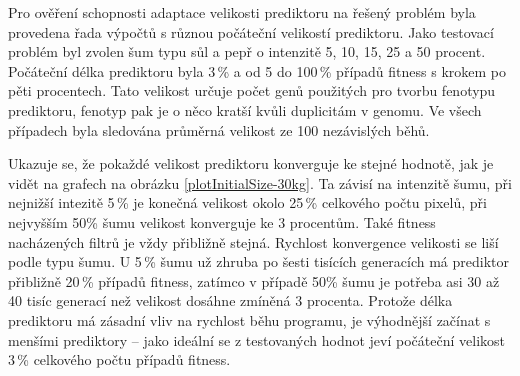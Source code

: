 Pro ověření schopnosti adaptace velikosti prediktoru na řešený problém byla provedena řada výpočtů s různou počáteční velikostí prediktoru. Jako testovací problém byl zvolen šum typu sůl a pepř o intenzitě 5, 10, 15, 25 a 50 procent. Počáteční délka prediktoru byla 3\,\% a od 5 do 100\,\% případů fitness s krokem po pěti procentech. Tato velikost určuje počet genů použitých pro tvorbu fenotypu prediktoru, fenotyp pak je o něco kratší kvůli duplicitám v genomu. Ve všech případech byla sledována průměrná velikost ze 100 nezávislých běhů.

Ukazuje se, že pokaždé velikost prediktoru konverguje ke stejné hodnotě, jak je vidět na grafech na obrázku \ref{plotInitialSize-30kg}. Ta závisí na intenzitě šumu, při nejnižší intezitě 5\,\% je konečná velikost okolo 25\,\% celkového počtu pixelů, při nejvyšším 50\% šumu velikost konverguje ke 3 procentům. Také fitness nacházených filtrů je vždy přibližně stejná. Rychlost konvergence velikosti se liší podle typu šumu. U 5\,\% šumu už zhruba po šesti tisících generacích má prediktor přibližně 20\,\% případů fitness, zatímco v případě 50\% šumu je potřeba asi 30 až 40 tisíc generací než velikost dosáhne zmíněná 3 procenta. Protože délka prediktoru má zásadní vliv na rychlost běhu programu, je výhodnější začínat s menšími prediktory -- jako ideální se z testovaných hodnot jeví počáteční velikost 3\,\% celkového počtu případů fitness.

